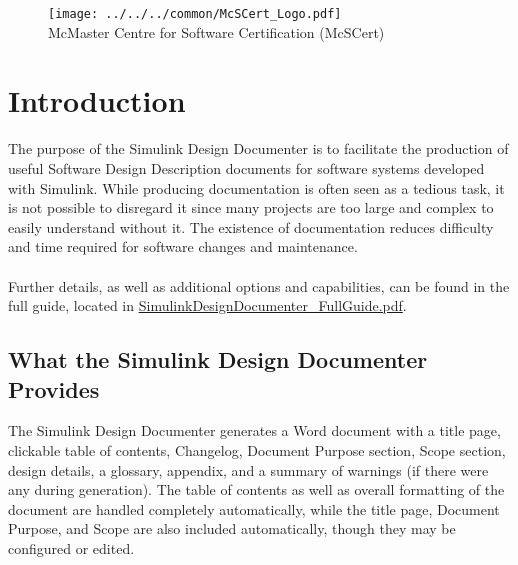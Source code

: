 \documentclass{article}
\title{\ToolName}
\date{\monthyeardate\today}
\makeatletter
\newcommand{\ToolName}{Simulink Design Documenter\@\xspace}
\newcommand{\sdd}{Software Design Description\@\xspace}
\makeatother
\begin{document}
\maketitle
\vfill

\begin{figure}
	\centering
	\texttt{[image: ../../../common/McSCert\_Logo.pdf]} \\
	McMaster Centre for Software Certification (McSCert)
\end{figure}

\newpage

\section{Introduction}


The purpose of the \ToolName is to facilitate the production of useful \sdd documents for software systems developed with Simulink. While producing documentation is often seen as a tedious task, it is not possible to disregard it since many projects are too large and complex to easily understand without it. The existence of documentation reduces difficulty and time required for software changes and maintenance.
\\\\
Further details, as well as additional options and capabilities, can be found in the full guide, located in \href{run:SimulinkDesignDocumenter_FullGuide.pdf}{SimulinkDesignDocumenter\_FullGuide.pdf}.

\subsection*{What the \ToolName Provides}

The \ToolName generates a Word document with a title page, clickable table of contents, Changelog,  Document Purpose section, Scope section, design details, a glossary, appendix, and a summary of warnings (if there were any during generation).
The table of contents as well as overall formatting of the document are handled completely automatically, while the title page, Document Purpose, and Scope are also included automatically, though they may be configured or edited.
\end{document}
